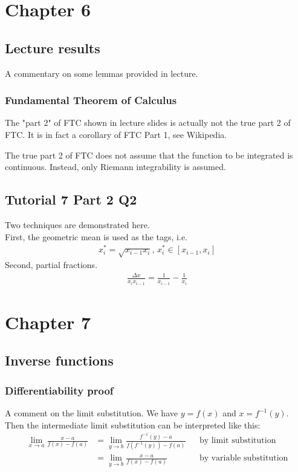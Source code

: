 \documentclass{article}
\begin{document}
\section{Chapter 6}
\subsection{Lecture results}
A commentary on some lemmas provided in lecture.
\subsubsection{Fundamental Theorem of Calculus}
The "part 2" of FTC shown in lecture slides is actually not the true part 2 of FTC. It is in fact a corollary of FTC Part 1, see Wikipedia.

The true part 2 of FTC does not assume that the function to be integrated is continuous. Instead, only Riemann integrability is assumed.


\subsection{Tutorial 7 Part 2 Q2}
Two techniques are demonstrated here.\\
First, the geometric mean is used as the tags, i.e.
\begin{align*}
    x_i^*=\sqrt{x_{i-1}x_i},\, x_i^*\in [x_{i-1}, x_i]
\end{align*}
Second, partial fractions.
\begin{align*}
    \frac{\Delta x}{x_ix_{i-1}}=\frac{1}{x_{i-1}}-\frac{1}{x_i}
\end{align*}

\section{Chapter 7}
\subsection{Inverse functions}
\subsubsection{Differentiability proof}
A comment on the limit substitution.
We have $y=f(x)$ and $x=f^{-1}(y)$.
Then the intermediate limit substitution can be interpreted like this:
\begin{align*}
    \lim_{x\rightarrow a}\frac{x-a}{f(x)-f(a)} &= \lim_{y\rightarrow b}\frac{f^{-1}(y) - a}{f(f^{-1}(y))-f(a)} &&\text{by limit substitution} \\
    &= \lim_{y\rightarrow b}\frac{x-a}{f(x)-f(a)} &&\text{by variable substitution}
\end{align*}
\end{document}
